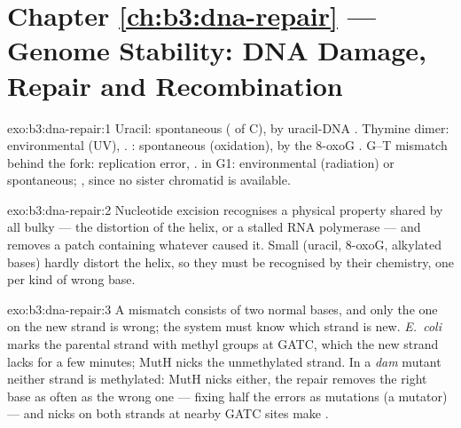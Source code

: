 \section*{Chapter \ref{ch:b3:dna-repair} --- Genome Stability: DNA Damage, Repair and Recombination}

\begin{solution}{exo:b3:dna-repair:1}
Uracil: spontaneous ( of C),  by
uracil-DNA . Thymine dimer: environmental (UV), . : spontaneous (oxidation),  by the 8-oxoG . G--T mismatch behind the fork:
replication error, .  in G1:
environmental (radiation) or spontaneous; ,
since no sister chromatid is available.
\end{solution}

\begin{solution}{exo:b3:dna-repair:2}
Nucleotide excision recognises a physical property shared by all bulky
 --- the distortion of the helix, or a stalled RNA polymerase
--- and removes a patch containing whatever caused it. Small 
(uracil, 8-oxoG, alkylated bases) hardly distort the helix, so they
must be recognised by their chemistry, one  per kind of
wrong base.
\end{solution}

\begin{solution}{exo:b3:dna-repair:3}
A mismatch consists of two normal bases, and only the one on the new
strand is wrong; the system must know which strand is new.
\emph{E.~coli} marks the parental strand with methyl groups at GATC,
which the new strand lacks for a few minutes; MutH nicks the
unmethylated strand. In a \emph{dam} mutant neither strand is
methylated: MutH nicks either, the repair removes the right base as
often as the wrong one --- fixing half the errors as mutations
(a mutator) --- and nicks on both strands at nearby GATC sites make
.
\end{solution}

